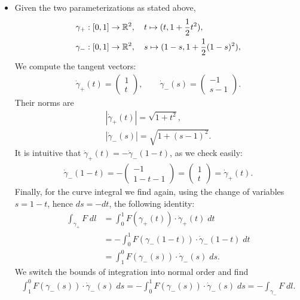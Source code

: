 \documentclass[11pt]{article}
\begin{document}
\begin{solution}
\begin{itemize}
        \item
		Given the two parameterizations as stated above, 
		\begin{align}
			\gamma_+ &: [0,1] \rightarrow \mathbb{R}^2, \quad t \mapsto ( t, 1 + \frac 1 2 t^2 ),
			\\
			\gamma_- &: [0,1] \rightarrow \mathbb{R}^2, \quad s \mapsto ( 1-s, 1 + \frac 1 2 (1-s)^2 ),
		\end{align}
		We compute the tangent vectors:
        \begin{align*}
            \dot\gamma_+(t) = \begin{pmatrix} 1 \\ t \end{pmatrix}, 
            \qquad 
            \dot\gamma_-(s) = \begin{pmatrix} -1 \\ s - 1 \end{pmatrix}.
        \end{align*}
		Their norms are 
		\begin{align*}
            |\dot \gamma_+(t)| = \sqrt{1 + t^2},
            \\
            |\dot \gamma_-(s)| = \sqrt{1 + (s-1)^2}.
        \end{align*}
        It is intuitive that $\dot\gamma_+(t) = - \dot\gamma_-(1-t)$, as we check easily:
        \begin{align*}
            \dot\gamma_-(1-t) 
            = 
            -
            \begin{pmatrix} -1 \\ 1-t - 1 \end{pmatrix}
            =
            \begin{pmatrix}  1 \\ t       \end{pmatrix}
            =
            \dot\gamma_+(t)
            .
        \end{align*}
        Finally, for the curve integral we find again,
        using the change of variables $s = 1 - t$, hence $ds = - dt$, 
        the following identity:
        \begin{align*}
            \int_{\gamma_+} F \;dl 
            &= 
            \int_0^1 F(\gamma_+(t)) \cdot \dot\gamma_+(t) \;dt
            \\&
            = 
            -
            \int_0^1 F(\gamma_-(1 - t)) \cdot \dot\gamma_-(1 - t) \;dt
            \\&
            = 
            \int_1^0 F(\gamma_-(s)) \cdot \dot\gamma_-(s) \;ds
            .
        \end{align*}
        We switch the bounds of integration into normal order and find 
        \begin{align*}
            \int_1^0 F(\gamma_-(s)) \cdot \dot\gamma_-(s) \;ds
            = 
            -
            \int_0^1 F(\gamma_-(s)) \cdot \dot\gamma_-(s) \;ds
            = 
            -\int_{\gamma_-} F \;dl
            .
        \end{align*}
    \end{itemize}
\end{solution}
\end{document}
